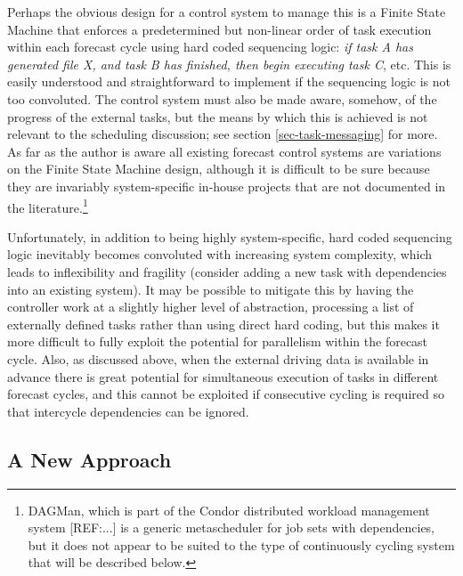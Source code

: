 \documentclass[11pt,a4paper]{article}
\begin{document}
Perhaps the obvious design for a control system to manage this is a
Finite State Machine that enforces a predetermined but non-linear order
of task execution within each forecast cycle using hard coded sequencing
logic: {\em if task A has generated file X, and task B has finished,
then begin executing task C}, etc. This is easily understood and
straightforward to implement if the sequencing logic is not too
convoluted.  The control system must also be made aware, somehow, of the
progress of the external tasks, but the means by which this is achieved
is not relevant to the scheduling discussion; see section
\ref{sec-task-messaging} for more.  As far as the author is aware all
existing forecast control systems are variations on the Finite State
Machine design, although it is difficult to be sure because they are
invariably system-specific in-house projects that are not documented in
the literature.\footnote{DAGMan, which is part of the Condor distributed
workload management system [REF:...] is a generic metascheduler for job
sets with dependencies, but it does not appear to be suited to the type
of continuously cycling system that will be described below.}

Unfortunately, in addition to being highly system-specific, hard coded
sequencing logic inevitably becomes convoluted with increasing system
complexity, which leads to inflexibility and fragility (consider adding
a new task with dependencies into an existing system). It may be
possible to mitigate this by having the controller work at a slightly
higher level of abstraction, processing a list of externally defined
tasks rather than using direct hard coding, but this makes it more
difficult to fully exploit the potential for parallelism within the
forecast cycle. Also, as discussed above, when the external driving data
is available in advance there is great potential for simultaneous
execution of tasks in different forecast cycles, and this cannot be
exploited if consecutive cycling is required so that intercycle
dependencies can be ignored. 


\subsection{A New Approach} 
\end{document}
